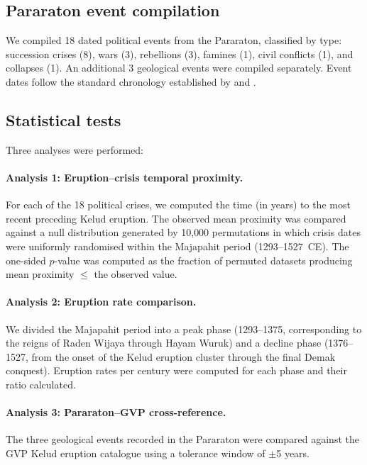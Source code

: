 \documentclass[12pt,a4paper]{article}
\begin{document}
\subsection{Pararaton event compilation}

We compiled 18 dated political events from the Pararaton, classified by type: succession crises (8), wars (3), rebellions (3), famines (1), civil conflicts (1), and collapses (1).
An additional 3 geological events were compiled separately.
Event dates follow the standard chronology established by \citet{brandes1896} and \citet{pigeaud1967}.

\subsection{Statistical tests}

Three analyses were performed:

\paragraph{Analysis 1: Eruption--crisis temporal proximity.}
For each of the 18 political crises, we computed the time (in years) to the most recent preceding Kelud eruption.
The observed mean proximity was compared against a null distribution generated by 10{,}000 permutations in which crisis dates were uniformly randomised within the Majapahit period (1293--1527~CE).
The one-sided $p$-value was computed as the fraction of permuted datasets producing mean proximity $\leq$ the observed value.

\paragraph{Analysis 2: Eruption rate comparison.}
We divided the Majapahit period into a peak phase (1293--1375, corresponding to the reigns of Raden Wijaya through Hayam Wuruk) and a decline phase (1376--1527, from the onset of the Kelud eruption cluster through the final Demak conquest).
Eruption rates per century were computed for each phase and their ratio calculated.

\paragraph{Analysis 3: Pararaton--GVP cross-reference.}
The three geological events recorded in the Pararaton were compared against the GVP Kelud eruption catalogue using a tolerance window of $\pm$5 years.
\end{document}
